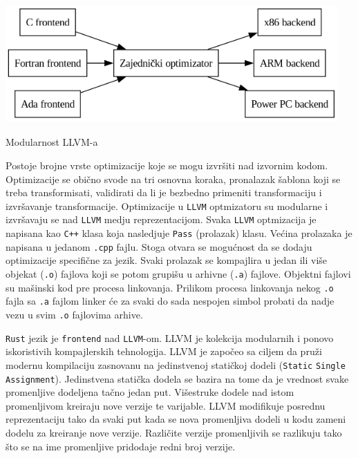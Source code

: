 \documentclass[11pt]{article}
\begin{document}
\begin{listing}[H]
\begin{center}
\includegraphics[width=5in, height=1.8in]{assets/images/modern_compiler_design.png}
\end{center}
\caption{Modularnost LLVM-a}
\label{lst:llvm_modular}
\end{listing}

Postoje brojne vrste optimizacije koje se mogu izvršiti nad izvornim kodom. Optimizacije se obično svode 
na tri osnovna koraka, pronalazak šablona koji se treba transformisati, validirati da li je bezbedno primeniti 
transformaciju i izvršavanje transformacije. Optimizacije u \verb|LLVM| optmizatoru su modularne i izvršavaju 
se nad \verb|LLVM| medju reprezentacijom. Svaka \verb|LLVM| optmizacija je napisana kao \verb|C++| klasa koja 
nasledjuje \verb|Pass| (prolazak) klasu. Većina prolazaka je napisana u jedanom \verb|.cpp| fajlu.
Stoga otvara se mogućnost da se dodaju optimizacije specifične za jezik. Svaki prolazak se kompajlira u jedan 
ili više objekat (\verb|.o|) fajlova koji se potom grupišu u arhivne (\verb|.a|) fajlove. Objektni fajlovi 
su mašinski kod pre procesa linkovanja. Prilikom procesa linkovanja 
nekog \verb|.o| fajla sa \verb|.a| fajlom linker će za svaki do sada nespojen simbol probati da nadje 
vezu u svim \verb|.o| fajlovima arhive.



\verb|Rust| jezik je \verb|frontend| nad \verb|LLVM|-om.
LLVM je kolekcija modularnih i ponovo iskoristivih kompajlerskih tehnologija. LLVM je započeo 
sa ciljem da pruži modernu kompilaciju zasnovanu na jedinstvenoj statičkoj dodeli (\verb|Static| \verb|Single| \verb|Assignment|).
Jedinstvena statička dodela se bazira na tome da je vrednost svake promenljive dodeljena tačno jedan put. Višestruke dodele 
nad istom promenljivom kreiraju nove verzije te varijable. LLVM modifikuje posrednu reprezentaciju tako da svaki put 
kada se nova promenljiva dodeli u kodu zameni dodelu za kreiranje nove verzije.
Različite verzije promenljivih se razlikuju tako što se na ime promenljive pridodaje redni broj verzije.
\newpage
\end{document}
